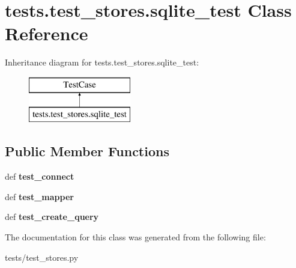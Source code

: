 \hypertarget{classtests_1_1test__stores_1_1sqlite__test}{\section{tests.\-test\-\_\-stores.\-sqlite\-\_\-test Class Reference}
\label{classtests_1_1test__stores_1_1sqlite__test}
}
Inheritance diagram for tests.\-test\-\_\-stores.\-sqlite\-\_\-test\-:\begin{figure}[H]
\begin{center}
\leavevmode
\includegraphics[height=2.000000cm]{classtests_1_1test__stores_1_1sqlite__test}
\end{center}
\end{figure}
\subsection*{Public Member Functions}
\begin{DoxyCompactItemize}
\item 
\hypertarget{classtests_1_1test__stores_1_1sqlite__test_ac7e870c7b3992aaebbe7b79c745da8fd}{def {\bfseries test\-\_\-connect}}\label{classtests_1_1test__stores_1_1sqlite__test_ac7e870c7b3992aaebbe7b79c745da8fd}

\item 
\hypertarget{classtests_1_1test__stores_1_1sqlite__test_a0c3eab179470d84e633656fa43d0a47c}{def {\bfseries test\-\_\-mapper}}\label{classtests_1_1test__stores_1_1sqlite__test_a0c3eab179470d84e633656fa43d0a47c}

\item 
\hypertarget{classtests_1_1test__stores_1_1sqlite__test_a089d774289e05ab810966484c380907b}{def {\bfseries test\-\_\-create\-\_\-query}}\label{classtests_1_1test__stores_1_1sqlite__test_a089d774289e05ab810966484c380907b}

\end{DoxyCompactItemize}


The documentation for this class was generated from the following file\-:\begin{DoxyCompactItemize}
\item 
tests/test\-\_\-stores.\-py\end{DoxyCompactItemize}
